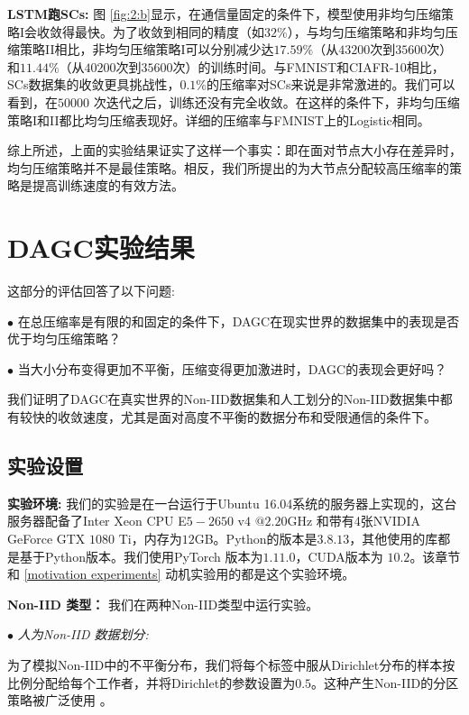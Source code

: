 \noindent \textbf{LSTM跑SCs:} 图 \ref{fig:2:b}显示，在通信量固定的条件下，模型使用非均匀压缩策略I会收敛得最快。为了收敛到相同的精度（如$32\%$），与均匀压缩策略和非均匀压缩策略II相比，非均匀压缩策略I可以分别减少达$17.59\%$（从$43200$次到$35600$次）和$11.44\%$（从$40200$次到$35600$次）的训练时间。与FMNIST和CIAFR-10相比，SCs数据集的收敛更具挑战性，$0.1\%$的压缩率对SCs来说是非常激进的。我们可以看到，在$50000$ 次迭代之后，训练还没有完全收敛。在这样的条件下，非均匀压缩策略I和II都比均匀压缩表现好。详细的压缩率与FMNIST上的Logistic相同。


综上所述，上面的实验结果证实了这样一个事实：即在面对节点大小存在差异时，均匀压缩策略并不是最佳策略。相反，我们所提出的为大节点分配较高压缩率的策略是提高训练速度的有效方法。

\section{DAGC实验结果}

这部分的评估回答了以下问题:

$\bullet$ 在总压缩率是有限的和固定的条件下，DAGC在现实世界的数据集中的表现是否优于均匀压缩策略？

$\bullet$  当大小分布变得更加不平衡，压缩变得更加激进时，DAGC的表现会更好吗？

我们证明了DAGC在真实世界的Non-IID数据集和人工划分的Non-IID数据集中都有较快的收敛速度，尤其是面对高度不平衡的数据分布和受限通信的条件下。

\subsection{实验设置}
%

\noindent \textbf{实验环境:}
我们的实验是在一台运行于Ubuntu 16.04系统的服务器上实现的，这台服务器配备了Inter Xeon CPU E$5-2650$ v$4$  $@2.20$GHz 和带有4张NVIDIA GeForce GTX $1080$ Ti，内存为$12$GB。Python的版本是$3.8.13$，其他使用的库都是基于Python版本。我们使用PyTorch 版本为$1.11.0$，CUDA版本为 $10.2$。该章节和 \ref{motivation experiments} 动机实验用的都是这个实验环境。

\noindent \textbf{Non-IID 类型：} 我们在两种Non-IID类型中运行实验。

\noindent$\bullet$ \textit{人为Non-IID 数据划分:} 

为了模拟Non-IID中的不平衡分布，我们将每个标签中服从Dirichlet分布的样本按比例分配给每个工作者，并将Dirichlet的参数设置为$0.5$。这种产生Non-IID的分区策略被广泛使用 \cite{li2020practical,niidbench,wang2020federated} 。

